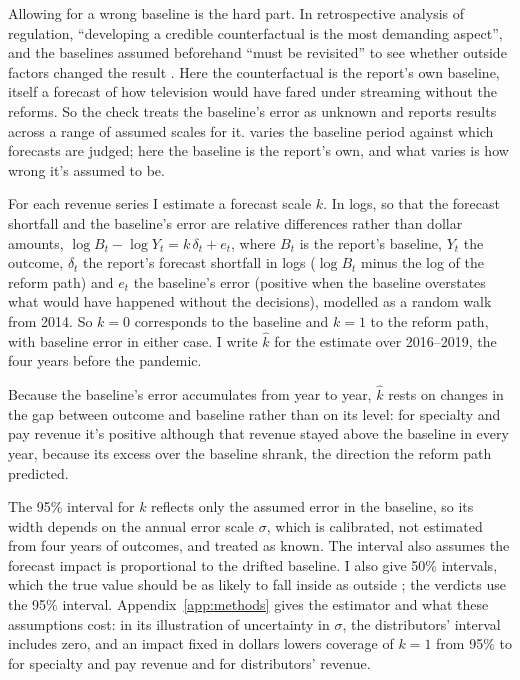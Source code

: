 Allowing for a wrong baseline is the hard part. In retrospective analysis of regulation, \enquote{developing a credible counterfactual is the most demanding aspect}, and the baselines assumed beforehand \enquote{must be revisited} to see whether outside factors changed the result \citep[286]{morgenstern2018retrospective}. Here the counterfactual is the report's own baseline, itself a forecast of how television would have fared under streaming without the reforms. So the check treats the baseline's error as unknown and reports results across a range of assumed scales for it. \textcite{kane2026sffa} varies the baseline period against which forecasts are judged; here the baseline is the report's own, and what varies is how wrong it's assumed to be.

For each revenue series I estimate a forecast scale \(k\). In logs, so that the forecast shortfall and the baseline's error are relative differences rather than dollar amounts, \(\log B_t-\log Y_t=k\,\delta_t+e_t\), where \(B_t\) is the report's baseline, \(Y_t\) the outcome, \(\delta_t\) the report's forecast shortfall in logs (\(\log B_t\) minus the log of the reform path) and \(e_t\) the baseline's error (positive when the baseline overstates what would have happened without the decisions), modelled as a random walk from 2014. So \(k=0\) corresponds to the baseline and \(k=1\) to the reform path, with baseline error in either case. I write \(\hat k\) for the estimate over 2016--2019, the four years before the pandemic.

Because the baseline's error accumulates from year to year, \(\hat k\) rests on changes in the gap between outcome and baseline rather than on its level: for specialty and pay revenue it's positive although that revenue stayed above the baseline in every year, because its excess over the baseline shrank, the direction the reform path predicted.

The 95\% interval for \(k\) reflects only the assumed error in the baseline, so its width depends on the annual error scale \(\sigma\), which is calibrated, not estimated from four years of outcomes, and treated as known. The interval also assumes the forecast impact is proportional to the drifted baseline. I also give 50\% intervals, which the true value should be as likely to fall inside as outside \citep[18]{gelmanHill2007}; the verdicts use the 95\% interval. Appendix~\ref{app:methods} gives the estimator and what these assumptions cost: in its illustration of uncertainty in \(\sigma\), the distributors' interval includes zero, and an impact fixed in dollars lowers coverage of \(k=1\) from 95\% to \lttvCoverDollarsSpec{} for specialty and pay revenue and \lttvCoverDollarsBDU{} for distributors' revenue.

